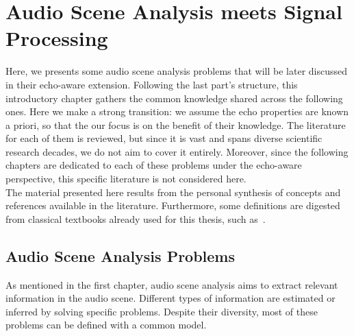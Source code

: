 \chapter{Audio Scene Analysis meets Signal Processing}\label{ch:application}

 \synopsisChApplication

\mynewline
Here, we presents some audio scene analysis problems that will be later discussed in their echo-aware extension.
Following the last part's structure, this introductory chapter gathers the common knowledge shared across the following ones.
Here we make a strong transition: we assume the echo properties are known a priori, so that the our focus is on the benefit of their knowledge.
The literature for each of them is reviewed, but since it is vast and spans diverse scientific research decades, we do not aim to cover it entirely.
Moreover, since the following chapters are dedicated to each of these problems under the echo-aware perspective, this specific literature is not considered here.
\\The material presented here results from the personal synthesis of concepts and references available in the literature.
Furthermore, some definitions are digested from classical textbooks already used for this thesis, such as~.

\section{Audio Scene Analysis Problems}\label{sec:application:scenario}
As mentioned in the first chapter, audio scene analysis aims to extract relevant information in the audio scene.
Different types of information are estimated or inferred by solving specific problems.
Despite their diversity, most of these problems can be defined with a common model.

